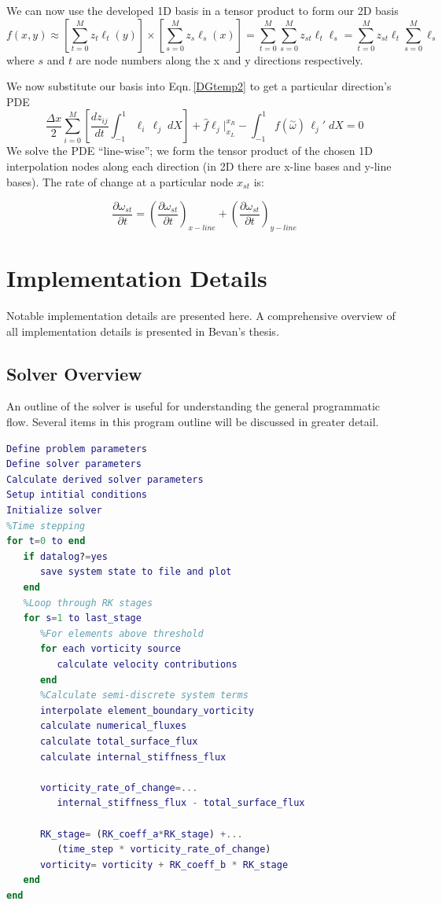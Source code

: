 \documentclass[]{aiaa-tc}%
\newcommand{\be}{\begin{equation}}
\newcommand{\ben}[1]{\begin{equation}\label{#1}}
\newcommand{\ee}{\end{equation}}
\newcommand{\aomega}{\overset{\sim}{\omega}}				%
\begin{document}
We can now use the developed 1D basis in a tensor product to form our 2D basis
\be f(x,y) \approx \left[\sum_{t=0}^M z_t \ell_t(y) \right] \times \left[ \sum_{s=0}^M z_s \ell_s(x) \right] = \sum_{t=0}^M \sum_{s=0}^M z_{st} \ell_t \ell_s =  \sum_{t=0}^M z_{st} \ell_t \sum_{s=0}^M  \ell_s \ee
where $s$ and $t$ are node numbers along the x and y directions respectively.

We now substitute our basis into Eqn.\,\eqref{DGtemp2} to get a particular direction's PDE
\ben{DGJoshTemp} \frac{\Delta x}{2}	\sum_{i=0}^M \left[ \frac{d z_{ij}}{dt}	\int_{-1}^{1}\ell_i  \, \ell_j \;dX \right]
+\hat{f}\ell_j \Big|^{x_R}_{x_L} 
- \int_{-1}^{1} f(\aomega) \, \ell_j' \;dX = 0 \ee
We solve the PDE ``line-wise''; we form the tensor product of the chosen 1D interpolation nodes along each direction (in 2D there are x-line bases and y-line bases). The rate of change at a particular node $x_{st}$ is:

\be \frac{\partial \omega_{st}}{\partial t} = (\frac{\partial \omega_{st}}{\partial t})_{x-line} + (\frac{\partial \omega_{st}}{\partial t})_{y-line} \ee

\section{Implementation Details}
Notable implementation details are presented here. A comprehensive overview of all implementation details is presented in Bevan's thesis\cite{Bevan}.

\subsection{Solver Overview}
An outline of the solver is useful for understanding the general programmatic flow. Several items in this program outline will be discussed in greater detail.

\begin{lstlisting}[language=Matlab]
Define problem parameters
Define solver parameters
Calculate derived solver parameters
Setup intitial conditions
Initialize solver
%Time stepping
for t=0 to end
   if datalog?=yes
      save system state to file and plot
   end
   %Loop through RK stages
   for s=1 to last_stage
      %For elements above threshold
      for each vorticity source
         calculate velocity contributions
      end
      %Calculate semi-discrete system terms
      interpolate element_boundary_vorticity
      calculate numerical_fluxes
      calculate total_surface_flux
      calculate internal_stiffness_flux
		
      vorticity_rate_of_change=...
         internal_stiffness_flux - total_surface_flux
		
      RK_stage= (RK_coeff_a*RK_stage) +...
         (time_step * vorticity_rate_of_change)
      vorticity= vorticity + RK_coeff_b * RK_stage
   end
end
\end{lstlisting}
\end{document}
